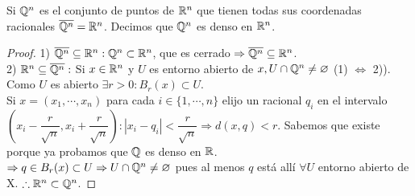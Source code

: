\begin{eg}
  Si \(\mathbb{Q}^n\) es el conjunto de puntos de \(\mathbb{R}^n\) que tienen todas sus coordenadas racionales \(\overline{\mathbb{Q}^n} = \mathbb{R}^n\). Decimos que \(\mathbb{Q}^n\) es denso en \(\mathbb{R}^n\).

  \begin{proof}
    1) \(\overline{\mathbb{Q}^n} \subseteq \mathbb{R}^n : \mathbb{Q}^n \subset \mathbb{R}^n\), que es cerrado \(\Rightarrow \overline{\mathbb{Q}^n} \subseteq \mathbb{R}^n\). \\
    2) \(\mathbb{R}^n \subseteq \overline{\mathbb{Q}^n}:\) Si \(x \in \mathbb{R}^n\) y \(U\) es entorno abierto de \(x, U \cap \mathbb{Q}^n \neq \varnothing\) (1) \(\iff\) 2)). Como \(U\) es abierto \(\exists r > 0 : B_r(x) \subset U\). \\
    Si \(x = (x_1, \cdots, x_n)\) para cada \(i \in \{1, \cdots, n\}\) elijo un racional \(q_i\) en el intervalo \((x_i - \dfrac{r}{\sqrt{n}}, x_i + \dfrac{r}{\sqrt{n}}) : |x_i - q_i| < \dfrac{r}{\sqrt{n}} \Rightarrow d(x, q) < r\). Sabemos que existe porque ya probamos que \(\mathbb{Q}\) es denso en \(\mathbb{R}\). \\
    \(\Rightarrow q \in B_r(x) \subset U \Rightarrow U \cap \mathbb{Q}^n \neq \varnothing\) pues al menos \(q\) está allí \(\forall U\) entorno abierto de X.
    \(\therefore \mathbb{R}^n \subset \mathbb{Q}^n\).
  \end{proof}
\end{eg}